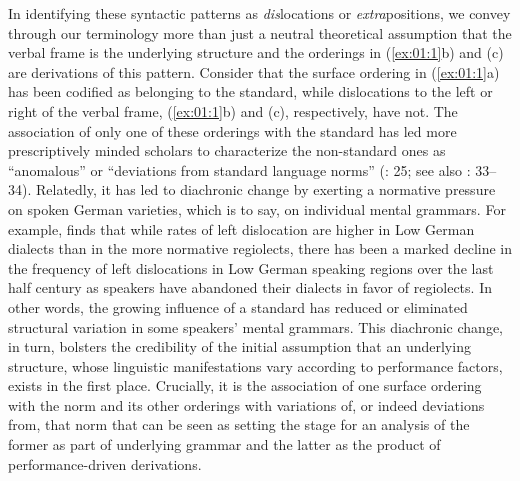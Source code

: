 In identifying these syntactic patterns as \textit{dis}locations or \textit{extra}positions, we convey through our terminology more than just a neutral theoretical assumption that the verbal frame is the underlying structure and the orderings in (\ref{ex:01:1}b) and (c) are derivations of this pattern. Consider that the surface ordering in (\ref{ex:01:1}a) has been codified as belonging to the standard, while dislocations to the left or right of the verbal frame, (\ref{ex:01:1}b) and (c), respectively, have not. The association of only one of these orderings with the standard has led more prescriptively minded scholars to characterize the non-standard ones as “anomalous” or “deviations from standard language norms” (\citealt{Dewald2012}: 25; see also \citealt{Altmann1981}: 33--34). Relatedly, it has led to diachronic change by exerting a normative pressure on spoken German varieties, which is to say, on individual mental grammars. For example, \citet[207]{Evans2023} finds that while rates of left dislocation are higher in Low German dialects than in the more normative regiolects, there has been a marked decline in the frequency of left dislocations in Low German speaking regions over the last half century as speakers have abandoned their dialects in favor of regiolects. In other words, the growing influence of a standard has reduced or eliminated structural variation in some speakers’ mental grammars. This diachronic change, in turn, bolsters the credibility of the initial assumption that an underlying structure, whose linguistic manifestations vary according to performance factors, exists in the first place. Crucially, it is the association of one surface ordering with the norm and its other orderings with variations of, or indeed deviations from, that norm that can be seen as setting the stage for an analysis of the former as part of underlying grammar and the latter as the product of performance-driven derivations. 

